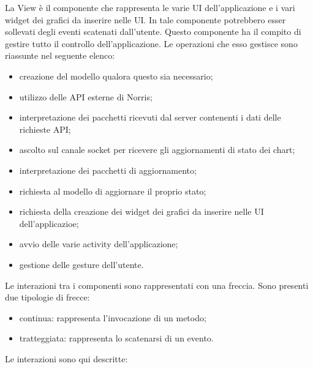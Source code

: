         La View è il componente che rappresenta le varie UI dell'applicazione e i vari widget dei grafici da inserire nelle UI. In tale componente potrebbero esser sollevati degli eventi scatenati dall'utente.
        Questo componente ha il compito di gestire tutto il controllo dell'applicazione. Le operazioni che esso gestisce sono riassunte nel seguente elenco:
        	\begin{itemize}
        		\item creazione del modello qualora questo sia necessario;
        		\item utilizzo delle API esterne di Norris;
        		\item interpretazione dei pacchetti ricevuti dal server contenenti i dati delle richieste API;
        		\item ascolto sul canale socket per ricevere gli aggiornamenti di stato dei chart;
        		\item interpretazione dei pacchetti di aggiornamento;
        		\item richiesta al modello di aggiornare il proprio stato;
        		\item richiesta della creazione dei widget dei grafici da inserire nelle UI dell'applicazioe;
        		\item avvio delle varie activity dell'applicazione;
        		\item gestione delle gesture dell'utente.
        \end{itemize}
    	Le interazioni tra i componenti sono rappresentati con una freccia. Sono presenti due tipologie di frecce:
    	\begin{itemize}
    			\item{continua: } rappresenta l'invocazione di un metodo;
    			\item{tratteggiata: } rappresenta lo scatenarsi di un evento.
    		\end{itemize}
    	Le interazioni sono qui descritte:
